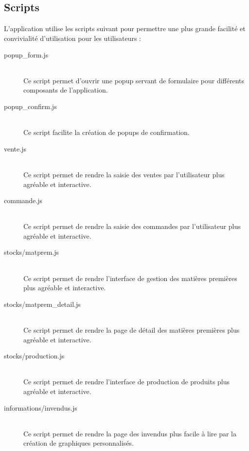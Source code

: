     \subsection{Scripts}
        \paragraph{}
            L'application utilise les scripts suivant pour permettre une plus
            grande facilité et convivialité d'utilisation pour les
            utilisateurs :
        \begin{description}
            \item[popup\_form.js]\hfill \\
                Ce script permet d'ouvrir une popup servant de formulaire pour
                différents composants de l'application.
            \item[popup\_confirm.js]\hfill \\
                Ce script facilite la création de popups de confirmation.
            \item[vente.js]\hfill \\
                Ce script permet de rendre la saisie des ventes par 
                l'utilisateur plus agréable et interactive.
            \item[commande.js]\hfill \\
                Ce script permet de rendre la saisie des commandes par 
                l'utilisateur plus agréable et interactive.
            \item[stocks/matprem.js]\hfill \\
                Ce script permet de rendre l'interface de gestion des matières
                premières plus agréable et interactive.
            \item[stocks/matprem\_detail.js]\hfill \\
                Ce script permet de rendre la page de détail des matières
                premières plus agréable et interactive.
            \item[stocks/production.js]\hfill \\
                Ce script permet de rendre l'interface de production de
                produits plus agréable et interactive.
            \item[informations/invendus.js]\hfill \\
                Ce script permet de rendre la page des invendus plus facile
                à lire par la création de graphiques personnalisés.

\end{description}
